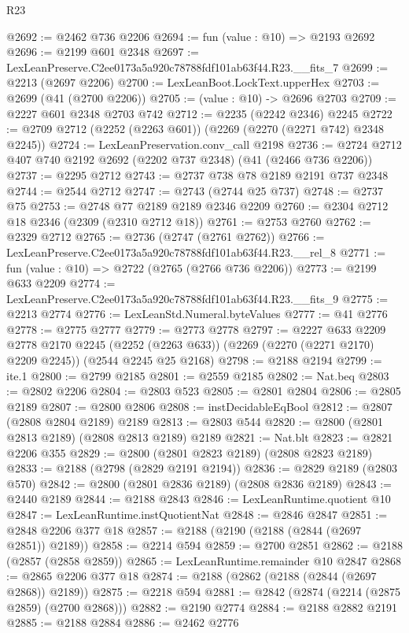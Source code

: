 \begin{lexlean}{R23}
\begin{coremodule}
@2692 := @2462 @736 @2206
@2694 := fun (value : @10) => @2193 @2692
@2696 := @2199 @601 @2348
@2697 := LexLeanPreserve.C2ee0173a5a920c78788fdf101ab63f44.R23.__fits_7
@2699 := @2213 (@2697 @2206)
@2700 := LexLeanBoot.LockText.upperHex
@2703 := @2699 (@41 (@2700 @2206))
@2705 := (value : @10) -> @2696 @2703
@2709 := @2227 @601 @2348 @2703 @742
@2712 := @2235 (@2242 @2346) @2245
@2722 := @2709 @2712 (@2252 (@2263 @601)) (@2269 (@2270 (@2271 @742) @2348 @2245))
@2724 := LexLeanPreservation.conv_call @2198
@2736 := @2724 @2712 @407 @740 @2192 @2692 (@2202 @737 @2348) (@41 (@2466 @736 @2206))
@2737 := @2295 @2712
@2743 := @2737 @738 @78 @2189 @2191 @737 @2348
@2744 := @2544 @2712
@2747 := @2743 (@2744 @25 @737)
@2748 := @2737 @75
@2753 := @2748 @77 @2189 @2189 @2346 @2209
@2760 := @2304 @2712 @18 @2346 (@2309 (@2310 @2712 @18))
@2761 := @2753 @2760
@2762 := @2329 @2712
@2765 := @2736 (@2747 (@2761 @2762))
@2766 := LexLeanPreserve.C2ee0173a5a920c78788fdf101ab63f44.R23.__rel_8
@2771 := fun (value : @10) => @2722 (@2765 (@2766 @736 @2206))
@2773 := @2199 @633 @2209
@2774 := LexLeanPreserve.C2ee0173a5a920c78788fdf101ab63f44.R23.__fits_9
@2775 := @2213 @2774
@2776 := LexLeanStd.Numeral.byteValues
@2777 := @41 @2776
@2778 := @2775 @2777
@2779 := @2773 @2778
@2797 := @2227
    @633
    @2209
    @2778
    @2170
    @2245
    (@2252 (@2263 @633))
    (@2269 (@2270 (@2271 @2170) @2209 @2245))
    (@2544 @2245 @25 @2168)
@2798 := @2188 @2194
@2799 := ite.{1}
@2800 := @2799 @2185
@2801 := @2559 @2185
@2802 := Nat.beq
@2803 := @2802 @2206
@2804 := @2803 @523
@2805 := @2801 @2804
@2806 := @2805 @2189
@2807 := @2800 @2806
@2808 := instDecidableEqBool
@2812 := @2807 (@2808 @2804 @2189) @2189
@2813 := @2803 @544
@2820 := @2800 (@2801 @2813 @2189) (@2808 @2813 @2189) @2189
@2821 := Nat.blt
@2823 := @2821 @2206 @355
@2829 := @2800 (@2801 @2823 @2189) (@2808 @2823 @2189)
@2833 := @2188 (@2798 (@2829 @2191 @2194))
@2836 := @2829 @2189 (@2803 @570)
@2842 := @2800 (@2801 @2836 @2189) (@2808 @2836 @2189)
@2843 := @2440 @2189
@2844 := @2188 @2843
@2846 := LexLeanRuntime.quotient @10
@2847 := LexLeanRuntime.instQuotientNat
@2848 := @2846 @2847
@2851 := @2848 @2206 @377 @18
@2857 := @2188 (@2190 (@2188 (@2844 (@2697 @2851)) @2189))
@2858 := @2214 @594
@2859 := @2700 @2851
@2862 := @2188 (@2857 (@2858 @2859))
@2865 := LexLeanRuntime.remainder @10 @2847
@2868 := @2865 @2206 @377 @18
@2874 := @2188 (@2862 (@2188 (@2844 (@2697 @2868)) @2189))
@2875 := @2218 @594
@2881 := @2842 (@2874 (@2214 (@2875 @2859) (@2700 @2868)))
@2882 := @2190 @2774
@2884 := @2188 @2882 @2191
@2885 := @2188 @2884
@2886 := @2462 @2776

\end{coremodule}
\end{lexlean}
